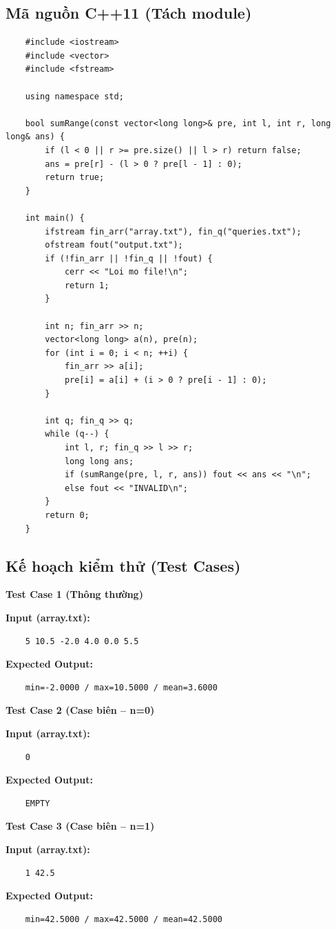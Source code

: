 \subsection{Mã nguồn C++11 (Tách module)}
    \begin{lstlisting}
    #include <iostream>
    #include <vector>
    #include <fstream>

    using namespace std;

    bool sumRange(const vector<long long>& pre, int l, int r, long long& ans) {
        if (l < 0 || r >= pre.size() || l > r) return false;
        ans = pre[r] - (l > 0 ? pre[l - 1] : 0);
        return true;
    }

    int main() {
        ifstream fin_arr("array.txt"), fin_q("queries.txt");
        ofstream fout("output.txt");
        if (!fin_arr || !fin_q || !fout) {
            cerr << "Loi mo file!\n";
            return 1;
        }

        int n; fin_arr >> n;
        vector<long long> a(n), pre(n);
        for (int i = 0; i < n; ++i) {
            fin_arr >> a[i];
            pre[i] = a[i] + (i > 0 ? pre[i - 1] : 0);
        }

        int q; fin_q >> q;
        while (q--) {
            int l, r; fin_q >> l >> r;
            long long ans;
            if (sumRange(pre, l, r, ans)) fout << ans << "\n";
            else fout << "INVALID\n";
        }
        return 0;
    }
\end{lstlisting}

\subsection{Kế hoạch kiểm thử (Test Cases)}

    \textbf{Test Case 1 (Thông thường)}

    \textbf{Input (array.txt):}
    \begin{lstlisting}
    5 10.5 -2.0 4.0 0.0 5.5\end{lstlisting}

    \textbf{Expected Output:}
    \begin{lstlisting}
    min=-2.0000 / max=10.5000 / mean=3.6000\end{lstlisting}

    \vspace{0.5cm}

    \textbf{Test Case 2 (Case biên -- n=0)}

    \textbf{Input (array.txt):}
    \begin{lstlisting}
    0\end{lstlisting}

    \textbf{Expected Output:}
    \begin{lstlisting}
    EMPTY\end{lstlisting}
    \textbf{Test Case 3 (Case biên -- n=1)}

    \textbf{Input (array.txt):}
    \begin{lstlisting}
    1 42.5\end{lstlisting}

    \textbf{Expected Output:}
    \begin{lstlisting}
    min=42.5000 / max=42.5000 / mean=42.5000\end{lstlisting}